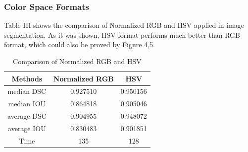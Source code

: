 \documentclass[conference]{IEEEtran}
\begin{document}
\subsubsection{Color Space Formats}
Table III shows the comparison of Normalized RGB and HSV applied in image segmentation.
As it was shown, HSV format performs much better than RGB format,
which could also be proved by Figure 4,5.
\begin{table}[htbp]
\caption{Comparison of Normalized RGB and HSV}
\begin{center}
\begin{tabular}{|c|c|c|}

\hline
Methods&Normalized RGB &HSV \\
\hline
median DSC  &0.927510 &0.950156\\
\hline
median IOU &0.864818 &0.905046\\
\hline
average DSC  &0.904955 &0.948072\\
\hline
average IOU &0.830483 &0.901851\\
\hline
Time &135 &128\\
\hline

\end{tabular}
\label{tab3}
\end{center}
\end{table}
\end{document}
